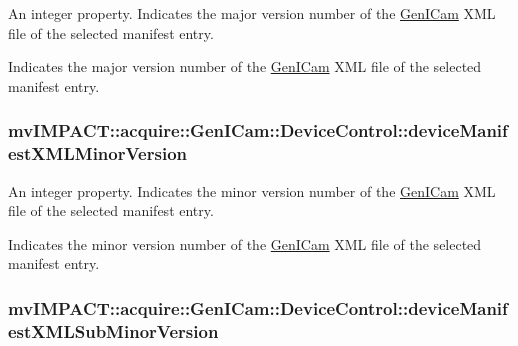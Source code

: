 An integer property. Indicates the major version number of the \hyperlink{namespacemv_i_m_p_a_c_t_1_1acquire_1_1_gen_i_cam}{Gen\+I\+Cam} X\+M\+L file of the selected manifest entry. 

Indicates the major version number of the \hyperlink{namespacemv_i_m_p_a_c_t_1_1acquire_1_1_gen_i_cam}{Gen\+I\+Cam} X\+M\+L file of the selected manifest entry. \hypertarget{classmv_i_m_p_a_c_t_1_1acquire_1_1_gen_i_cam_1_1_device_control_a8e20cdae0c0f4a3cdbf2b2ed1bccddf8}{
\subsubsection[{device\+Manifest\+X\+M\+L\+Minor\+Version}]{ mv\+I\+M\+P\+A\+C\+T\+::acquire\+::\+Gen\+I\+Cam\+::\+Device\+Control\+::device\+Manifest\+X\+M\+L\+Minor\+Version}}\label{classmv_i_m_p_a_c_t_1_1acquire_1_1_gen_i_cam_1_1_device_control_a8e20cdae0c0f4a3cdbf2b2ed1bccddf8}


An integer property. Indicates the minor version number of the \hyperlink{namespacemv_i_m_p_a_c_t_1_1acquire_1_1_gen_i_cam}{Gen\+I\+Cam} X\+M\+L file of the selected manifest entry. 

Indicates the minor version number of the \hyperlink{namespacemv_i_m_p_a_c_t_1_1acquire_1_1_gen_i_cam}{Gen\+I\+Cam} X\+M\+L file of the selected manifest entry. \hypertarget{classmv_i_m_p_a_c_t_1_1acquire_1_1_gen_i_cam_1_1_device_control_ad4e70b4af0f3ed3fab5419436279ed5f}{
\subsubsection[{device\+Manifest\+X\+M\+L\+Sub\+Minor\+Version}]{ mv\+I\+M\+P\+A\+C\+T\+::acquire\+::\+Gen\+I\+Cam\+::\+Device\+Control\+::device\+Manifest\+X\+M\+L\+Sub\+Minor\+Version}}\label{classmv_i_m_p_a_c_t_1_1acquire_1_1_gen_i_cam_1_1_device_control_ad4e70b4af0f3ed3fab5419436279ed5f}



